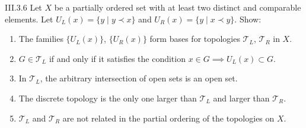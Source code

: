 \begin{problem}{III.3.6}\label{problem:III.3.6}
Let \( X \) be a partially ordered set {\color{red}with at least two distinct and comparable elements}. Let \( U_{L}(x) = \{y \mid y \prec x\} \) and \( U_{R}(x) = \{y \mid x \prec y\} \). Show:
\begin{enumerate}[label={(\alph*)}]
    \item The families \(\{U_{L}(x)\}\), \(\{U_{R}(x)\}\) form bases for topologies \(\mathscr{T}_{L}\), \(\mathscr{T}_{R}\) in \(X\).
    \item \( G \in \mathscr{T}_{L} \) if and only if it satisfies the condition \( x \in G \implies U_{L}(x) \subset G \).
    \item In \(\mathscr{T}_{L}\), the arbitrary intersection of open sets is an open set.
    \item The discrete topology is the only one larger than \(\mathscr{T}_{L}\) and larger than \(\mathscr{T}_{R}\).
    \item \(\mathscr{T}_{L}\) and \(\mathscr{T}_{R}\) are not related in the partial ordering of the topologies on \(X\).
\end{enumerate}
\end{problem}


